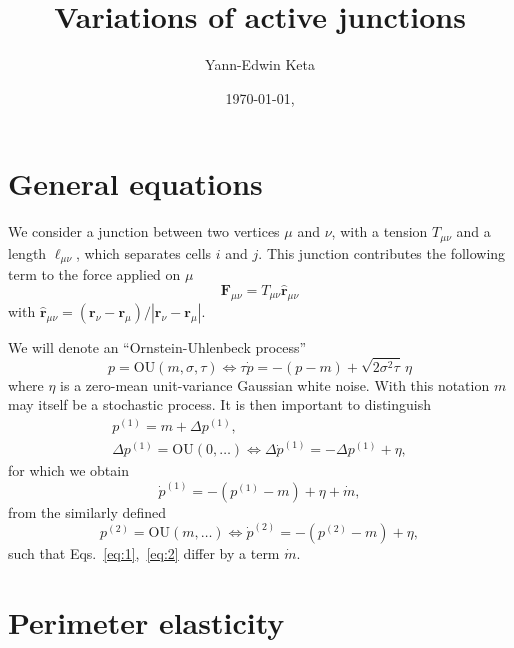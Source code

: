 \documentclass{revtex-custom}
\begin{document}
\title{Variations of active junctions}
\author{Yann-Edwin Keta}
\date{\today, \currenttime}                                                     
\maketitle

\section{General equations}

We consider a junction between two vertices $\mu$ and $\nu$, with a tension $T_{\mu\nu}$ and a length $\ell_{\mu\nu}$, which separates cells $i$ and $j$. This junction contributes the following term to the force applied on $\mu$
\begin{equation}
\boldsymbol{F}_{\mu\nu} = T_{\mu\nu} \hat{\boldsymbol{r}}_{\mu\nu}
\end{equation}
with $\hat{\boldsymbol{r}}_{\mu\nu} = (\boldsymbol{r}_{\nu} - \boldsymbol{r}_{\mu})/|\boldsymbol{r}_{\nu} - \boldsymbol{r}_{\mu}|$.

We will denote an ``Ornstein-Uhlenbeck process''
\begin{equation}
p = \mathrm{OU}(m, \sigma, \tau) \Leftrightarrow \tau \dot{p} = -(p - m) + \sqrt{2 \sigma^2 \tau} \, \eta
\end{equation}
where $\eta$ is a zero-mean unit-variance Gaussian white noise. With this notation $m$ may itself be a stochastic process. It is then important to distinguish
\begin{subequations}
\begin{align}
p^{(1)} = m + \Delta p^{(1)},\\
\Delta p^{(1)} = \mathrm{OU}(0, \ldots) \Leftrightarrow \Delta \dot{p}^{(1)} = - \Delta p^{(1)} + \eta,
\end{align}
\end{subequations}
for which we obtain
\begin{equation}
\dot{p}^{(1)} = -(p^{(1)} - m) + \eta + \dot{m},
\label{eq:1}
\end{equation}
from the similarly defined
\begin{equation}
p^{(2)} = \mathrm{OU}(m, \ldots) \Leftrightarrow \dot{p}^{(2)} = -(p^{(2)} - m) + \eta,
\label{eq:2}
\end{equation}
such that Eqs.~\ref{eq:1},~\ref{eq:2} differ by a term $\dot{m}$.

\section{Perimeter elasticity}
\end{document}
